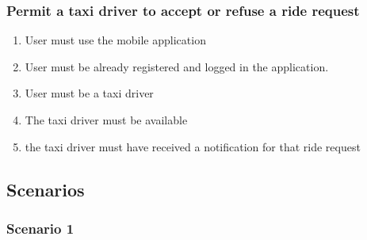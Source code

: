 		\subsubsection{Permit a taxi driver to accept or refuse a ride request}
			\begin{enumerate}[label=\bfseries R\arabic*:]
				\item User must use the mobile application
				\item User must be already registered and logged in the application.
				\item User must be a taxi driver
				\item The taxi driver must be available
				\item the taxi driver must have received a notification for that ride request
			\end{enumerate}
	\subsection{Scenarios}
		\subsubsection{Scenario 1}